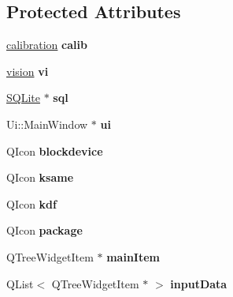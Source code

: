 \subsection*{Protected Attributes}
\begin{DoxyCompactItemize}
\item 
\hypertarget{classMainWindow_af0f15ce63e7c003a7eb12f88472ac675}{\hyperlink{classcalibration}{calibration} {\bfseries calib}}\label{classMainWindow_af0f15ce63e7c003a7eb12f88472ac675}

\item 
\hypertarget{classMainWindow_a102393c36ab2af8821bbb60d0726f7d0}{\hyperlink{classvision}{vision} {\bfseries vi}}\label{classMainWindow_a102393c36ab2af8821bbb60d0726f7d0}

\item 
\hypertarget{classMainWindow_a27a47dcf3589dd010ce7803cb3b2ff85}{\hyperlink{classSQLite}{S\-Q\-Lite} $\ast$ {\bfseries sql}}\label{classMainWindow_a27a47dcf3589dd010ce7803cb3b2ff85}

\item 
\hypertarget{classMainWindow_a35466a70ed47252a0191168126a352a5}{Ui\-::\-Main\-Window $\ast$ {\bfseries ui}}\label{classMainWindow_a35466a70ed47252a0191168126a352a5}

\item 
\hypertarget{classMainWindow_add3756176df4e7230246c550d9b6e2db}{Q\-Icon {\bfseries blockdevice}}\label{classMainWindow_add3756176df4e7230246c550d9b6e2db}

\item 
\hypertarget{classMainWindow_ac1beb6db1d37a2a6c3d66688aefd9a66}{Q\-Icon {\bfseries ksame}}\label{classMainWindow_ac1beb6db1d37a2a6c3d66688aefd9a66}

\item 
\hypertarget{classMainWindow_a9d4567d65912ab7578d00827129c4755}{Q\-Icon {\bfseries kdf}}\label{classMainWindow_a9d4567d65912ab7578d00827129c4755}

\item 
\hypertarget{classMainWindow_a211b3162d03a5c229ac006150286429e}{Q\-Icon {\bfseries package}}\label{classMainWindow_a211b3162d03a5c229ac006150286429e}

\item 
\hypertarget{classMainWindow_a4a0290f0cbe44f14933b0903728d420c}{Q\-Tree\-Widget\-Item $\ast$ {\bfseries main\-Item}}\label{classMainWindow_a4a0290f0cbe44f14933b0903728d420c}

\item 
\hypertarget{classMainWindow_ab00172798ad65e4b60d1e14bc681a50d}{Q\-List$<$ Q\-Tree\-Widget\-Item $\ast$ $>$ {\bfseries input\-Data}}\label{classMainWindow_ab00172798ad65e4b60d1e14bc681a50d}


\end{DoxyCompactItemize}
